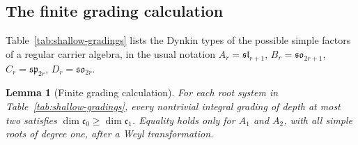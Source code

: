 \documentclass{article}
\newtheorem{lemma}[theorem]{Lemma}
\theoremstyle{definition}
\theoremstyle{remark}
\begin{document}
\subsection{The finite grading calculation}
\label{app:shallow-enumeration}

Table~\ref{tab:shallow-gradings} lists the Dynkin types of the possible
simple factors of a regular carrier algebra, in the usual notation
$A_r=\mathfrak{sl}_{r+1}$, $B_r=\mathfrak{so}_{2r+1}$,
$C_r=\mathfrak{sp}_{2r}$, $D_r=\mathfrak{so}_{2r}$.


\begin{lemma}[Finite grading calculation]
\label{lem:finite-grading-calculation}
For each root system in Table~\ref{tab:shallow-gradings}, every
nontrivial integral grading of depth at most two satisfies
$\dim\mathfrak c_0\ge\dim\mathfrak c_1$.
Equality holds only for $A_1$ and $A_2$, with all simple roots of
degree one, after a Weyl transformation.
\end{lemma}
\end{document}
